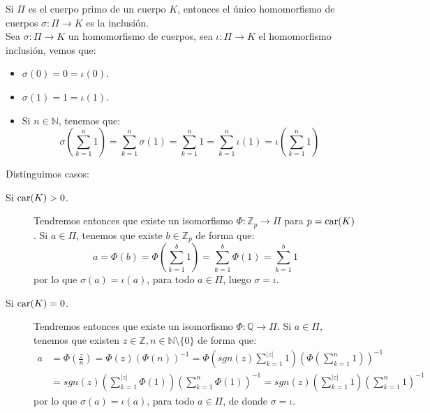 \begin{ejercicio} \label{ej:homomorfismo_primo}
    Si $\Pi$ es el cuerpo primo de un cuerpo $K$, entonces el único homomorfismo de cuerpos $\sigma:\Pi\to K$ es la inclusión.\\ 

    \noindent
    Sea $\sigma:\Pi\to K$ un homomorfismo de cuerpos, sea $\iota:\Pi\to K$ el homomorfismo inclusión, vemos que:
    \begin{itemize}
        \item $\sigma(0) = 0 = \iota(0)$.
        \item $\sigma(1) = 1 = \iota(1)$.
        \item Si $n\in \mathbb{N}$, tenemos que:
            \begin{equation*}
                \sigma\left(\sum_{k=1}^{n}1\right) = \sum_{k=1}^{n}\sigma(1) = \sum_{k=1}^{n}1 = \sum_{k=1}^{n}\iota(1) = \iota\left(\sum_{k=1}^{n}1\right)
            \end{equation*}
    \end{itemize}
    Distinguimos casos:
    \begin{description}
        \item [Si $\operatorname{car}(K) > 0$.] Tendremos entonces que existe un isomorfismo $\Phi:\mathbb{Z}_p\to \Pi$ para $p=\operatorname{car}(K)$. Si $a\in \Pi$, tenemos que existe $b\in \mathbb{Z}_p$ de forma que:
            \begin{equation*}
                a = \Phi(b) = \Phi\left(\sum_{k=1}^{b}1\right) = \sum_{k=1}^{b} \Phi (1) = \sum_{k=1}^{b} 1
            \end{equation*}
            por lo que $\sigma(a) = \iota(a)$, para todo $a\in \Pi$, luego $\sigma=\iota$.
        \item [Si $\operatorname{car}(K)=0$.] Tendremos entonces que existe un isomorfismo $\Phi:\mathbb{Q}\to \Pi$. Si $a\in \Pi$, tenemos que existen $z\in \mathbb{Z}, n\in \mathbb{N}\setminus\{0\}$ de forma que:
            \begin{align*}
                a &= \Phi\left(\frac{z}{n}\right) = \Phi(z){(\Phi(n))}^{-1} = \Phi\left(sgn(z)\sum_{k=1}^{|z|}1\right){\left(\Phi\left(\sum_{k=1}^{n}1\right)\right)}^{-1} \\ 
                  &= sgn(z)\left(\sum_{k=1}^{|z|}\Phi(1)\right){\left(\sum_{k=1}^{n}\Phi(1)\right)}^{-1}= sgn(z)\left(\sum_{k=1}^{|z|}1\right){\left(\sum_{k=1}^{n}1\right)}^{-1}
            \end{align*}
            por lo que $\sigma(a) = \iota(a)$, para todo $a\in \Pi$, de donde $\sigma=\iota$.
    \end{description}
\end{ejercicio}

